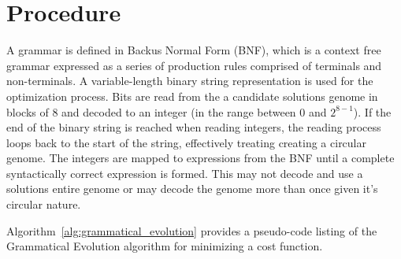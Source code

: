 \documentclass[a4paper, 11pt]{article}
\begin{document}
\section{Procedure}
\label{sec:procedure}
A grammar is defined in Backus Normal Form (BNF), which is a context free grammar expressed as a series of production rules comprised of terminals and non-terminals.
A variable-length binary string representation is used for the optimization process. Bits are read from the a candidate solutions genome in blocks of 8 and decoded to an integer (in the range between 0 and $2^{8-1}$). If the end of the binary string is reached when reading integers, the reading process loops back to the start of the string, effectively treating creating a circular genome. The integers are mapped to expressions from the BNF until a complete syntactically correct expression is formed. This may not decode and use a solutions entire genome or may decode the genome more than once given it's circular nature.

Algorithm~\ref{alg:grammatical_evolution} provides a pseudo-code listing of the Grammatical Evolution algorithm for minimizing a cost function.
\end{document}
